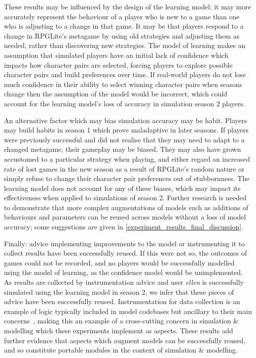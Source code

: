 These results may be influenced by the design of the learning model: it may more
accurately represent the behaviour of a player who is new to a game than one who
is adjusting to a change in that game. It may be that players respond to a
change in RPGLite's metagame by using old strategies and adjusting them as
needed, rather than discovering new strategies. The model of learning makes an
assumption that simulated players have an initial lack of confidence which
impacts how character pairs are selected, forcing players to explore possible
character pairs and build preferences over time. If real-world players do not
lose much confidence in their ability to select winning character pairs when
seasons change then the assumption of the model would be incorrect, which could
account for the learning model's loss of accuracy in simulation season 2
players.

An alternative factor which may bias simulation accuracy may be habit. Players
may build habits in season 1 which prove maladaptive in later seasons. If
players were previously successful and did not realise that they may need to
adapt to a changed metagame, their gameplay may be biased. They may also have
grown accustomed to a particular strategy when playing, and either regard an
increased rate of lost games in the new season as a result of RPGLite's random
nature or simply refuse to change their character pair preferences out of
stubbornness. The learning model does not account for any of these biases, which
may impact its effectiveness when applied to simulations of season 2. Further
research is needed to demonstrate that more complex augmentations of models such
as additions of behaviours and parameters can be reused across models without a
loss of model accuracy; some suggestions are given in
\cref{experiment_results_final_discussion}.

Finally: advice implementing improvements to the model or instrumenting it to
collect results have been successfully reused. If this were not so, the outcomes
of games could not be recorded, and no players would be successfully modelled
using the model of learning, as the confidence model would be unimplemented. As
results are collected by instrumentation advice and user \emph{ellen} is
successfully simulated using the learning model in season 2, we infer that these
pieces of advice have been successfully reused. Instrumentation for data
collection is an example of logic typically included in model codebases but
ancillary to their main concerns~\cite{gulyas1999use}, making this an example of
a cross-cutting concern in simulation \& modelling which these experiments
implement as aspects. These results add further evidence that aspects which
augment models can be successfully reused, and so constitute portable modules in
the context of simulation \& modelling.




